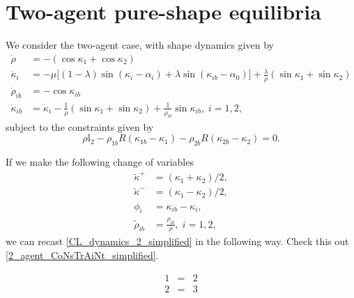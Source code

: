 \section{Two-agent pure-shape equilibria}

We consider the two-agent case, with shape dynamics given by
\begin{equation}
\begin{aligned}
\dot{\rho} &= - (\cos\kappa_1 + \cos\kappa_2) 
\\
\dot{\kappa}_i &= - \mu \Big[(1 - \lambda)\sin(\kappa_i - \alpha_i) + \lambda \sin(\kappa_{ib} - \alpha_0) \Big] + \frac{\lambda}{\rho}(\sin\kappa_1 + \sin\kappa_2) 
\\
\dot{\rho}_{ib} &= - \cos\kappa_{ib}  
\\
\dot{\kappa}_{ib} &= \dot{\kappa}_i - \frac{1}{\rho}(\sin\kappa_1 + \sin\kappa_2) + \frac{1}{\rho_{ib}} \sin\kappa_{ib},  \; i=1,2,
\end{aligned}
\label{CL_dynamics_2_simplified}
\end{equation}
subject to the constraints given by
\begin{equation}
\rho \mathbb{I}_2 - \rho_{1b} R(\kappa_{1b} - \kappa_1) - \rho_{2b} R(\kappa_{2b} - \kappa_{2}) = 0. 
\label{2_agent_CoNsTrAiNt_simplified}
\end{equation}

If we make the following change of variables
\begin{align}
\tilde{\kappa}^+ 
&= (\kappa_1 + \kappa_2)/2,
\\
\tilde{\kappa}^- 
&= 
(\kappa_1 - \kappa_2)/2,
\\
\phi_{i} 
&= 
\kappa_{ib} - \kappa_i,
\\
\tilde{\rho}_{ib} 
&= 
\frac{\rho_{ib} }{\rho}, 
\; i=1,2,
\end{align}
we can recast \eqref{CL_dynamics_2_simplified} in the following way. Check this out \eqref{2_agent_CoNsTrAiNt_simplified}.


\begin{eqnarray}
1 &=& 2 \\
2 &=& 3
\end{eqnarray}
  